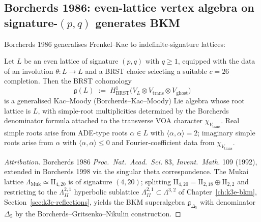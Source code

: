 \subsection{Borcherds 1986: even-lattice vertex algebra on signature-\texorpdfstring{$(p,q)$}{(p,q)} generates BKM}
\label{subsec:borcherds-1986-bkm}

Borcherds 1986 generalises Frenkel--Kac to indefinite-signature lattices:

\begin{theorem}
\label{thm:borcherds-1986-bkm}
Let $L$ be an even lattice of signature $(p,q)$ with $q\geq 1$, equipped with
the data of an involution $\theta\colon L\to L$ and a BRST choice selecting a
suitable $c = 26$ completion. Then the BRST cohomology
\[
 \mathfrak{g}(L)
 \;:=\;
 H^1_{\mathrm{BRST}}\bigl(V_L\otimes V_{\mathrm{trans}}\otimes V_{\mathrm{ghost}}\bigr)
\]
is a generalised Kac--Moody (Borcherds--Kac--Moody) Lie algebra whose root
lattice is $L$, with simple-root multiplicities determined by the
Borcherds denominator formula attached to the transverse VOA character
$\chi_{V_{\mathrm{trans}}}$. Real simple roots arise from ADE-type roots
$\alpha\in L$ with $\langle\alpha,\alpha\rangle = 2$; imaginary simple roots
arise from $\alpha$ with $\langle\alpha,\alpha\rangle\leq 0$ and
Fourier-coefficient data from $\chi_{V_{\mathrm{trans}}}$.
\end{theorem}

\begin{proof}[Attribution]
Borcherds 1986 \emph{Proc.\ Nat.\ Acad.\ Sci.} 83, \emph{Invent.\ Math.} 109 (1992),
extended in Borcherds 1998 via the singular theta correspondence. The Mukai
lattice $\Lambda_{\mathrm{Muk}}\simeq\mathrm{II}_{4,20}$ is of signature $(4,20)$;
splitting $\mathrm{II}_{4,20} = \mathrm{II}_{2,18}\oplus\mathrm{II}_{2,2}$
and restricting to the $\Lambda^{2,1}_{II}$ hyperbolic sublattice
$\Lambda^{2,1}_{II}\subset\Lambda^{3,2}$ of Chapter~\ref{ch:k3e-bkm},
Section~\ref{sec:k3e-reflections}, yields the BKM superalgebra
$\mathfrak{g}_{\Delta_5}$ with denominator $\Delta_5$ by the Borcherds--Gritsenko--Nikulin
construction.
\end{proof}

